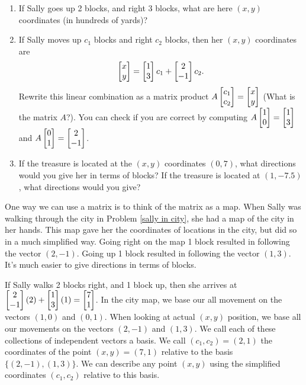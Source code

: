 \begin{problem}
\begin{enumerate}
 \item If Sally goes up 2 blocks, and right 3 blocks, what are here $(x,y)$ coordinates (in hundreds of yards)?
 \item If Sally moves up $c_1$ blocks and right $c_2$ blocks, then her $(x,y)$ coordinates are
$$\begin{bmatrix} x\\y \end{bmatrix}=\begin{bmatrix} 1\\3 \end{bmatrix}c_1+\begin{bmatrix} 2\\-1 \end{bmatrix}c_2.$$ Rewrite this linear combination as a matrix product $A\begin{bmatrix} c_1\\c_2 \end{bmatrix}=\begin{bmatrix} x\\y \end{bmatrix}$ (What is the matrix $A$?). You can check if you are correct by computing $A\begin{bmatrix} 1\\0 \end{bmatrix}=\begin{bmatrix} 1\\3 \end{bmatrix}$ and $A\begin{bmatrix} 0\\1 \end{bmatrix}=\begin{bmatrix} 2\\-1 \end{bmatrix}$. 
 \item If the treasure is located at the $(x,y)$ coordinates $(0,7)$, what directions would you give her in terms of blocks? If the treasure is located at $(1,-7.5)$, what directions would you give?
\end{enumerate}

\end{problem}


One way we can use a matrix is to think of the matrix as a map. When Sally was walking through the city in Problem \ref{sally in city}, she had a map of the city in her hands.  This map gave her the coordinates of locations in the city, but did so in a much simplified way. Going right on the map 1 block resulted in following the vector $(2,-1)$.  Going up 1 block resulted in following the vector $(1,3)$. It's much easier to give directions in terms of blocks.  

If Sally walks 2 blocks right, and 1 block up, then she arrives at $\begin{bmatrix} 2\\-1 \end{bmatrix}(2)+\begin{bmatrix} 1\\3 \end{bmatrix}(1) = \begin{bmatrix} 7\\1 \end{bmatrix}$. In the city map, we base our all movement on the vectors $(1,0)$ and $(0,1)$. When looking at actual $(x,y)$ position, we base all our movements on the vectors $(2,-1)$ and $(1,3)$. We call each of these collections of independent vectors a basis.  We call $(c_1,c_2)=(2,1)$ the coordinates of the point $(x,y)=(7,1)$ relative to the basis $\{(2,-1),(1,3)\}$. 
We can describe any point $(x,y)$ using the simplified coordinates $(c_1,c_2)$ relative to this basis.


